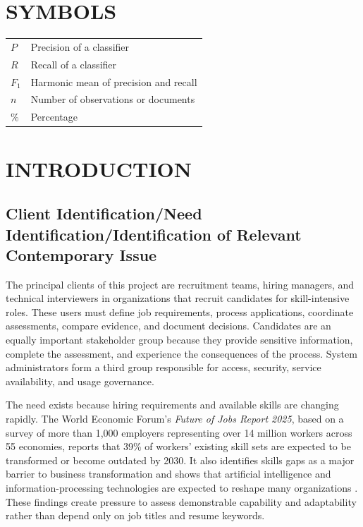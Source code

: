 \documentclass[12pt,a4paper,oneside]{report}
\renewcommand{\cite}[1]{}
\begin{document}
\clearpage
\chapter*{SYMBOLS}
\begin{tabular}{>{\bfseries}p{}p{}}
$P$ & Precision of a classifier \\
$R$ & Recall of a classifier \\
$F_1$ & Harmonic mean of precision and recall \\
$n$ & Number of observations or documents \\
$\%$ & Percentage \\
\end{tabular}

\clearpage
{}
\setcounter{page}{1}
\chapter{INTRODUCTION}

\section{Client Identification/Need Identification/Identification of Relevant Contemporary Issue}

The principal clients of this project are recruitment teams, hiring managers, and
technical interviewers in organizations that recruit candidates for skill-intensive
roles. These users must define job requirements, process applications, coordinate
assessments, compare evidence, and document decisions. Candidates are an equally
important stakeholder group because they provide sensitive information, complete the
assessment, and experience the consequences of the process. System administrators
form a third group responsible for access, security, service availability, and usage
governance.

The need exists because hiring requirements and available skills are changing rapidly.
The World Economic Forum's \textit{Future of Jobs Report 2025}, based on a survey of
more than 1,000 employers representing over 14 million workers across 55 economies,
reports that 39\% of workers' existing skill sets are expected to be transformed or
become outdated by 2030. It also identifies skills gaps as a major barrier to business
transformation and shows that artificial intelligence and information-processing
technologies are expected to reshape many organizations \cite{wef2025}. These findings
create pressure to assess demonstrable capability and adaptability rather than depend
only on job titles and resume keywords.
\end{document}

